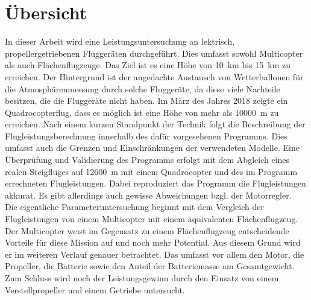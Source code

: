 \chapter*{Übersicht}
In dieser Arbeit wird eine Leistungsuntersuchung an lektrisch, propellergetriebenen Fluggeräten durchgeführt. Dies umfasst sowohl Multicopter als auch Flächenflugzeuge. Das Ziel ist es eine Höhe von \SI{10}{km} bis \SI{15}{km} zu erreichen. Der Hintergrund ist der angedachte Austausch von Wetterballonen für die Atmosphärenmessung durch solche Fluggeräte, da diese viele Nachteile besitzen, die die Fluggeräte nicht haben. Im März des Jahres 2018 zeigte ein Quadrocopterflug, dass es möglich ist eine Höhe von mehr als \SI{10000}{m} zu erreichen. 
Nach einem kurzen Standpunkt der Technik folgt die Beschreibung der Flugleistungsberechnung innerhalb des dafür vorgesehenen Programms. Dies umfasst auch die Grenzen und Einschränkungen der verwendeten Modelle. Eine Überprüfung und Validierung des Programms erfolgt mit dem Abgleich eines realen Steigfluges auf \SI{12600}{m} mit einem Quadrocopter und des im Programm errechneten Flugleistungen. Dabei reproduziert das Programm die Flugleistungen akkurat. Es gibt allerdings auch gewisse Abweichungen bzgl. der Motorregler. \\
Die eigentliche Parameteruntersuchung beginnt mit dem Vergleich der Flugleistungen von einem Multicopter mit einem äquivalenten Flächenflugzeug. Der Multicopter weist im Gegensatz zu einem Flächenflugzeug entscheidende Vorteile für diese Mission auf und noch mehr Potential. Aus diesem Grund wird er im weiteren Verlauf genauer betrachtet. Das umfasst vor allem den Motor, die Propeller, die Batterie sowie den Anteil der Batteriemasse am Gesamtgewicht. Zum Schluss wird noch der Leistungsgewinn durch den Einsatz von einem Verstellpropeller und einem Getriebe untersucht. 




